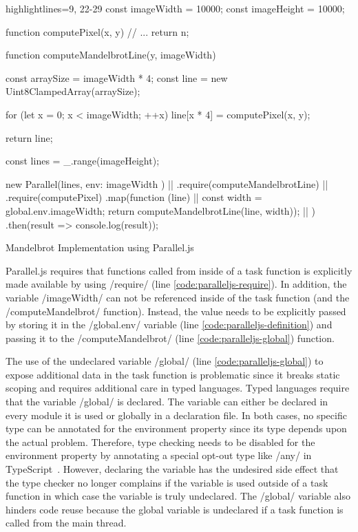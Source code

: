 \begin{listing}
	\begin{javascriptcode*}{highlightlines={9, 22-29}}
const imageWidth = 10000;
const imageHeight = 10000;

function computePixel(x, y) {
	// ...
	return n;
}

function computeMandelbrotLine(y, imageWidth) {
	const arraySize = imageWidth * 4;
	const line = new Uint8ClampedArray(arraySize);
	
	for (let x = 0; x < imageWidth; ++x) {
		line[x * 4] = computePixel(x, y);
	}
	
	return line;
}

const lines = _.range(imageHeight);

new Parallel(lines, {env: { imageWidth } }) |$\label{code:paralleljs-definition}$|
	.require(computeMandelbrotLine)  |$\label{code:paralleljs-require}$|
	.require(computePixel)
	.map(function (line) { |$\label{code:paralleljs-map}$|
		const width = global.env.imageWidth;
		return computeMandelbrotLine(line, width)); |$\label{code:paralleljs-global}$|
	})
	.then(result => console.log(result));
\end{javascriptcode*}

\caption{Mandelbrot Implementation using Parallel.js}
\label{fig:mandelbrot-paralleljs}
\end{listing}

Parallel.js requires that functions called from inside of a task function is explicitly made available by using \javascriptinline/require/ (line \ref{code:paralleljs-require}). In addition, the variable \javascriptinline/imageWidth/ can not be referenced inside of the task function (and the \javascriptinline/computeMandelbrot/ function). Instead, the value needs to be explicitly passed by storing it in the \javascriptinline/global.env/ variable (line \ref{code:paralleljs-definition}) and passing it to the \javascriptinline/computeMandelbrot/ (line \ref{code:paralleljs-global}) function.


The use of the undeclared variable \javascriptinline/global/ (line \ref{code:paralleljs-global}) to expose additional data in the task function is problematic since it breaks static scoping and requires additional care in typed languages. Typed languages require that the variable \javascriptinline/global/ is declared. The variable can either be declared in every module it is used or globally in a declaration file. In both cases, no specific type can be annotated for the environment property since its type depends upon the actual problem. Therefore,  type checking needs to be disabled for the environment property by annotating a special opt-out type like \javascriptinline/any/ in TypeScript~\cite{typescript}. However, declaring the variable has the undesired side effect that the type checker no longer complains if the variable is used outside of a task function in which case the variable is truly undeclared. The \javascriptinline/global/ variable also hinders code reuse because the global variable is undeclared if a task function is called from the main thread.

